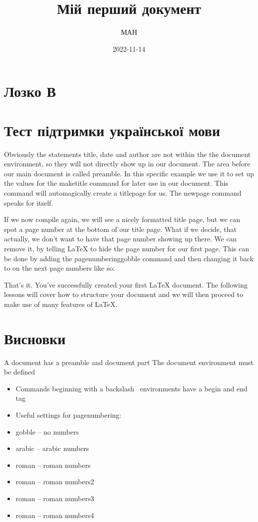 \documentclass{article}
\title{Мій перший документ}
\date{2022-11-14}
\author{МАН }
\begin{document}
	\maketitle
	\newpage
\section {Лозко В}	
\section{Тест підтримки української мови}
	
Obviously the statements title, date and author are not within the the document environment, so they will not directly show up in our document. The area before our main document is called preamble. In this specific example we use it to set up the values for the maketitle command for later use in our document. This command will automagically create a titlepage for us. The newpage command speaks for itself.

If we now compile again, we will see a nicely formatted title page, but we can spot a page number at the bottom of our title page. What if we decide, that actually, we don’t want to have that page number showing up there. We can remove it, by telling LaTeX to hide the page number for our first page. This can be done by adding the pagenumbering{gobble} command and then changing it back to  on the next page numbers like so:



That’s it. You’ve successfully created your first LaTeX document. The following lessons will cover how to structure your document and we will then proceed to make use of many features of LaTeX.

\section*{Висновки}

A document has a preamble and document part
The document environment must be defined
\begin{itemize}
	\item Commands beginning with a backslash \, environments have a begin and end tag
	\item Useful settings for pagenumbering:
	\item gobble – no numbers
	\item arabic – arabic numbers
	\item roman – roman numbers
	\item roman – roman numbers2
	\item roman – roman numbers3
	\item roman – roman numbers4
\end{itemize}
\end{document}
